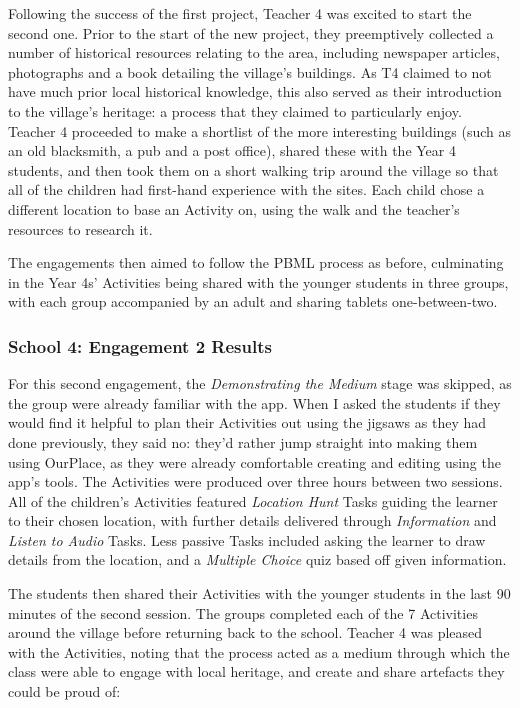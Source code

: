 Following the success of the first project, Teacher 4 was excited to start the second one. Prior to the start of the new project, they preemptively collected a number of historical resources relating to the area, including newspaper articles, photographs and a book detailing the village's buildings. As T4 claimed to not have much prior local historical knowledge, this also served as their introduction to the village's heritage: a process that they claimed to particularly enjoy. Teacher 4 proceeded to make a shortlist of the more interesting buildings (such as an old blacksmith, a pub and a post office), shared these with the Year 4 students, and then took them on a short walking trip around the village so that all of the children had first-hand experience with the sites. Each child chose a different location to base an Activity on, using the walk and the teacher's resources to research it.

The engagements then aimed to follow the PBML process as before, culminating in the Year 4s' Activities being shared with the younger students in three groups, with each group accompanied by an adult and sharing tablets one-between-two. 

\subsubsection{School 4: Engagement 2 Results}

For this second engagement, the \textit{Demonstrating the Medium} stage was skipped, as the group were already familiar with the app. When I asked the students if they would find it helpful to plan their Activities out using the jigsaws as they had done previously, they said no: they'd rather jump straight into making them using OurPlace, as they were already comfortable creating and editing using the app's tools. The Activities were produced over three hours between two sessions. All of the children's Activities featured \textit{Location Hunt} Tasks guiding the learner to their chosen location, with further details delivered through \textit{Information} and \textit{Listen to Audio} Tasks. Less passive Tasks included asking the learner to draw details from the location, and a \textit{Multiple Choice} quiz based off given information. 

The students then shared their Activities with the younger students in the last 90 minutes of the second session. The groups completed each of the 7 Activities around the village before returning back to the school. Teacher 4 was pleased with the Activities, noting that the process acted as a medium through which the class were able to engage with local heritage, and create and share artefacts they could be proud of:

